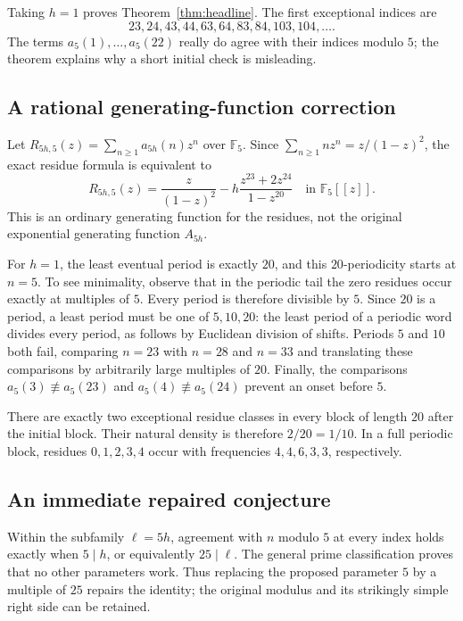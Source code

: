 \documentclass[11pt,letterpaper]{article}
\theoremstyle{definition}
\theoremstyle{remark}
\newcommand{\F}{\mathbb F}
\begin{document}
Taking $h=1$ proves Theorem~\ref{thm:headline}. The first exceptional
indices are
\[
 23,24,43,44,63,64,83,84,103,104,\ldots.
\]
The terms $a_5(1),\ldots,a_5(22)$ really do agree with their indices
modulo $5$; the theorem explains why a short initial check is misleading.

\subsection{A rational generating-function correction}
Let $R_{5h,5}(z)=\sum_{n\ge1}a_{5h}(n)z^n$ over $\F_5$. Since
$\sum_{n\ge1}nz^n=z/(1-z)^2$, the exact residue formula is equivalent to
\begin{equation}\label{eq:correctedgf}
 \boxed{\displaystyle
 R_{5h,5}(z)=\frac{z}{(1-z)^2}
 -h\frac{z^{23}+2z^{24}}{1-z^{20}}
 \quad\text{in }\F_5[[z]].}
\end{equation}
This is an ordinary generating function for the residues, not the
original exponential generating function $A_{5h}$.

For $h=1$, the least eventual period is exactly $20$, and this
$20$-periodicity starts at $n=5$. To see minimality, observe that in the
periodic tail the zero residues occur exactly at multiples of $5$.
Every period is therefore divisible by $5$. Since $20$ is a period, a
least period must be one of $5,10,20$: the least period of a periodic
word divides every period, as follows by Euclidean division of shifts.
Periods $5$ and $10$ both fail, comparing $n=23$ with $n=28$ and $n=33$
and translating these comparisons by arbitrarily large multiples of $20$.
Finally, the comparisons $a_5(3)\not\equiv a_5(23)$ and
$a_5(4)\not\equiv a_5(24)$ prevent an onset before $5$.

There are exactly two exceptional residue classes in every block of
length $20$ after the initial block. Their natural density is therefore
$2/20=1/10$. In a full periodic block, residues $0,1,2,3,4$ occur with
frequencies $4,4,6,3,3$, respectively.

\subsection{An immediate repaired conjecture}
Within the subfamily $\ell=5h$, agreement with $n$ modulo $5$ at every
index holds exactly when $5\mid h$, or equivalently $25\mid\ell$.
The general prime classification proves that no other parameters work.
Thus replacing the proposed parameter $5$ by a multiple of $25$ repairs
the identity; the original modulus and its strikingly simple right side
can be retained.
\end{document}
